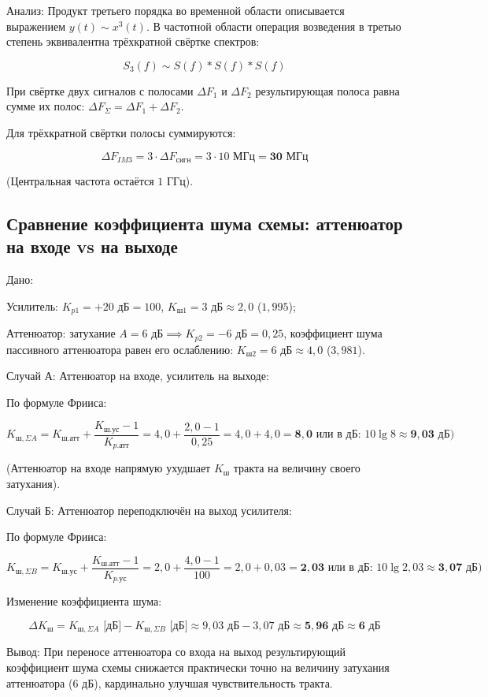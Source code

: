 Анализ: Продукт третьего порядка во временной области описывается выражением $y(t) \sim x^3(t)$. В частотной области операция возведения в третью степень эквивалентна трёхкратной свёртке спектров:

$$S_3(f) \sim S(f) * S(f) * S(f)$$

При свёртке двух сигналов с полосами $\Delta F_1$ и $\Delta F_2$ результирующая полоса равна сумме их полос: $\Delta F_{\Sigma} = \Delta F_1 + \Delta F_2$.

Для трёхкратной свёртки полосы суммируются:

$$\Delta F_{IM3} = 3 \cdot \Delta F_{\text{сигн}} = 3 \cdot 10\text{ МГц} = \mathbf{30\text{ МГц}}$$

(Центральная частота остаётся $1\text{ ГГц}$).

\subsection {Сравнение коэффициента шума схемы: аттенюатор на входе vs на выходе}

Дано:

Усилитель: $K_{p1} = +20\text{ дБ} = 100$, $K_{\text{ш1}} = 3\text{ дБ} \approx 2{,}0$ ($1{,}995$);

Аттенюатор: затухание $A = 6\text{ дБ} \implies K_{p2} = -6\text{ дБ} = 0{,}25$, коэффициент шума пассивного аттенюатора равен его ослаблению: $K_{\text{ш2}} = 6\text{ дБ} \approx 4{,}0$ ($3{,}981$).

Случай А: Аттенюатор на входе, усилитель на выходе:

По формуле Фрииса:

$$K_{\text{ш},\Sigma A} = K_{\text{ш.атт}} + \frac{K_{\text{ш.ус}} - 1}{K_{p.\text{атт}}} = 4{,}0 + \frac{2{,}0 - 1}{0{,}25} = 4{,}0 + 4{,}0 = \mathbf{8{,}0}\text{ или в дБ: } 10\lg 8 \approx \mathbf{9{,}03\text{ дБ}})$$

(Аттенюатор на входе напрямую ухудшает $K_{\text{ш}}$ тракта на величину своего затухания).

Случай Б: Аттенюатор переподключён на выход усилителя:

По формуле Фрииса:

$$K_{\text{ш},\Sigma B} = K_{\text{ш.ус}} + \frac{K_{\text{ш.атт}} - 1}{K_{p.\text{ус}}} = 2{,}0 + \frac{4{,}0 - 1}{100} = 2{,}0 + 0{,}03 = \mathbf{2{,}03}\text{ или в дБ: } 10\lg 2{,}03 \approx \mathbf{3{,}07\text{ дБ}})$$

Изменение коэффициента шума:

$$\Delta K_{\text{ш}} = K_{\text{ш},\Sigma A}\text{ [дБ]} - K_{\text{ш},\Sigma B}\text{ [дБ]} \approx 9{,}03\text{ дБ} - 3{,}07\text{ дБ} \approx \mathbf{5{,}96\text{ дБ}} \approx \mathbf{6\text{ дБ}}$$

Вывод: При переносе аттенюатора со входа на выход результирующий коэффициент шума схемы снижается практически точно на величину затухания аттенюатора ($6\text{ дБ}$), кардинально улучшая чувствительность тракта.